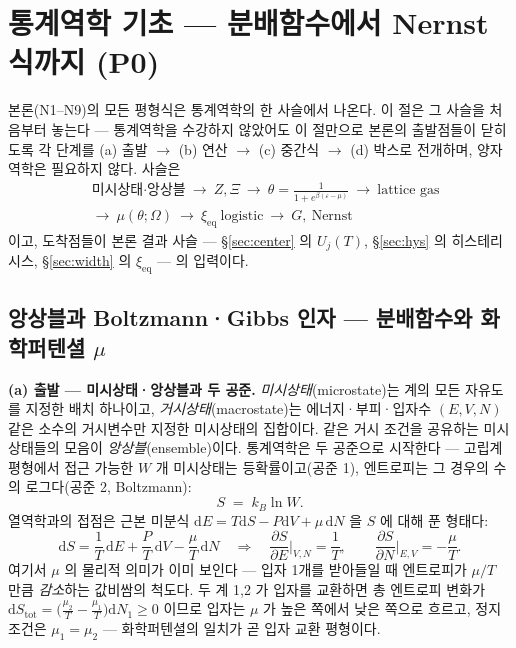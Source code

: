 \documentclass[11pt,a4paper]{article}
\newcommand{\dd}{\mathrm{d}}
\newcommand{\eq}{\mathrm{eq}}
\begin{document}
\section{통계역학 기초 --- 분배함수에서 Nernst 식까지 (P0)}\label{sec:sm-found}

본론(N1--N9)의 모든 평형식은 통계역학의 한 사슬에서 나온다. 이 절은 그 사슬을 처음부터 놓는다 ---
통계역학을 수강하지 않았어도 이 절만으로 본론의 출발점들이 닫히도록 각 단계를 (a) 출발 $\to$ (b) 연산
$\to$ (c) 중간식 $\to$ (d) 박스로 전개하며, 양자역학은 필요하지 않다. 사슬은
\[
\boxed{\;\begin{aligned}
&\text{미시상태·앙상블}\ \to\ Z,\Xi\ \to\ \theta=\frac{1}{1+e^{\beta(\varepsilon-\mu)}}\ \to\ \text{lattice gas}\\
&\to\ \mu(\theta;\Omega)\ \to\ \xi_\eq\ \text{logistic}\ \to\ G,\ \text{Nernst}
\end{aligned}\;}
\]
이고, 도착점들이 본론 결과 사슬 --- \S\ref{sec:center} 의 $U_j(T)$, \S\ref{sec:hys} 의 히스테리시스,
\S\ref{sec:width} 의 $\xi_\eq$ --- 의 입력이다.

\subsection{앙상블과 Boltzmann·Gibbs 인자 --- 분배함수와 화학퍼텐셜 $\mu$}\label{sec:sm-ensemble}
\textbf{(a) 출발 --- 미시상태·앙상블과 두 공준.} \emph{미시상태}(microstate)는 계의 모든 자유도를 지정한
배치 하나이고, \emph{거시상태}(macrostate)는 에너지·부피·입자수 $(E,V,N)$ 같은 소수의 거시변수만 지정한
미시상태의 집합이다. 같은 거시 조건을 공유하는 미시상태들의 모음이 \emph{앙상블}(ensemble)이다. 통계역학은
두 공준으로 시작한다 --- 고립계 평형에서 접근 가능한 $W$ 개 미시상태는 등확률이고(공준 1), 엔트로피는 그
경우의 수의 로그다(공준 2, Boltzmann):
\begin{equation}
S\;=\;k_B\ln W.
\label{eq:sm-S}
\end{equation}
열역학과의 접점은 근본 미분식 $\dd E=T\dd S-P\dd V+\mu\,\dd N$ 을 $S$ 에 대해 푼 형태다:
\begin{equation}
\dd S=\frac{1}{T}\,\dd E+\frac{P}{T}\,\dd V-\frac{\mu}{T}\,\dd N
\quad\Longrightarrow\quad
\frac{\partial S}{\partial E}\Big|_{V,N}=\frac1T,\qquad
\frac{\partial S}{\partial N}\Big|_{E,V}=-\frac{\mu}{T}.
\label{eq:sm-fund}
\end{equation}
여기서 $\mu$ 의 물리적 의미가 이미 보인다 --- 입자 1개를 받아들일 때 엔트로피가 $\mu/T$ 만큼 \emph{감소}하는
값비쌈의 척도다. 두 계 1,2 가 입자를 교환하면 총 엔트로피 변화가
$\dd S_\mathrm{tot}=\big(\tfrac{\mu_2}{T}-\tfrac{\mu_1}{T}\big)\dd N_1\ge0$ 이므로 입자는 $\mu$ 가 높은 쪽에서
낮은 쪽으로 흐르고, 정지 조건은 $\mu_1=\mu_2$ --- 화학퍼텐셜의 일치가 곧 입자 교환 평형이다.
\end{document}
